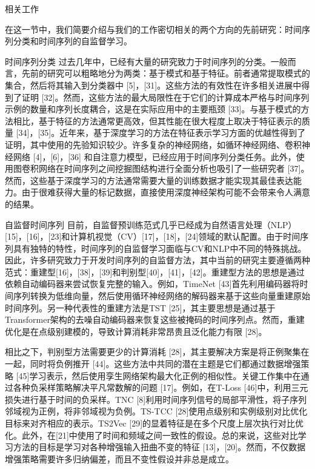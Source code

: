 \documentclass[a4paper,12pt]{article}
\begin{document}
\begin{section}{相关工作}

在这一节中，我们简要介绍与我们的工作密切相关的两个方向的先前研究：时间序列分类和时间序列的自监督学习。

\begin{subsection}{时间序列分类}
过去几年中，已经有大量的研究致力于时间序列的分类。一般而言，先前的研究可以粗略地分为两类：基于模式和基于特征。前者通常提取模式的集合，然后将其输入到分类器中 [5]，[31]。这些方法的有效性在许多相关进展中得到了证明 [32]。然而，这些方法的最大局限性在于它们的计算成本严格与时间序列示例的数量和序列长度耦合，这是在实际应用中的主要瓶颈 [33]。与基于模式的方法相比，基于特征的方法通常更高效，但其性能在很大程度上取决于特征表示的质量 [34]，[35]。近年来，基于深度学习的方法在特征表示学习方面的优越性得到了证明，其中使用的先验知识较少。许多复杂的神经网络，如循环神经网络、卷积神经网络 [4]，[6]，[36] 和自注意力模型，已经应用于时间序列分类任务。此外，使用图卷积网络在时间序列之间挖掘图结构进行全面分析也吸引了一些研究者 [37]。然而，这些基于深度学习的方法通常需要大量的训练数据才能实现其最佳表达能力。由于很难获得大量的标记数据，直接使用深度神经架构可能不会带来令人满意的结果。

\end{subsection}{自监督时间序列}
目前，自监督预训练范式几乎已经成为自然语言处理（NLP）[15]，[16]，[23]和计算机视觉（CV）[17]，[18]，[24]领域的默认配置。由于时间序列具有独特的特性，时间序列的自监督学习面临与CV和NLP中不同的特殊挑战。因此，许多研究致力于开发时间序列的自监督方法，其中当前的研究主要遵循两种范式：重建型[16]，[38]，[39]和判别型[40]，[41]，[42]。重建型方法的思想是通过依赖自动编码器来尝试恢复完整的输入。例如，TimeNet [43]首先利用编码器将时间序列转换为低维向量，然后使用循环神经网络的解码器来基于这些向量重建原始时间序列。另一种代表性的重建方法是TST [25]，其主要思想是通过基于Transformer架构的去噪自动编码器来恢复这些被掩码的时间序列点。然而，重建优化是在点级别建模的，导致计算消耗非常昂贵且泛化能力有限 [28]。

相比之下，判别型方法需要更少的计算消耗 [28]，其主要解决方案是将正例聚集在一起，同时将负例推开 [44]。这些方法中共同的潜在主题是它们都通过数据增强策略 [45]学习表示，然后使用孪生网络架构最大化正例的相似性。关键工作集中在通过各种负采样策略解决平凡常数解的问题 [17]。例如，在T-Loss [46]中，利用三元损失进行基于时间的负采样。TNC [8]利用时间序列信号的局部平滑性，将子序列邻域视为正例，将非邻域视为负例。TS-TCC [28]使用点级别和实例级别对比优化目标来对齐相应的表示。TS2Vec [29]的显着特征是在多个尺度上层次执行对比优化。此外，在[21]中使用了时间和频域之间一致性的假设。总的来说，这些对比学习方法的目标是学习对各种增强输入扭曲不变的特征 [13]，[20]。然而，不仅数据增强策略需要许多归纳偏差，而且不变性假设并非总是成立。

\end{section}
\end{document}
